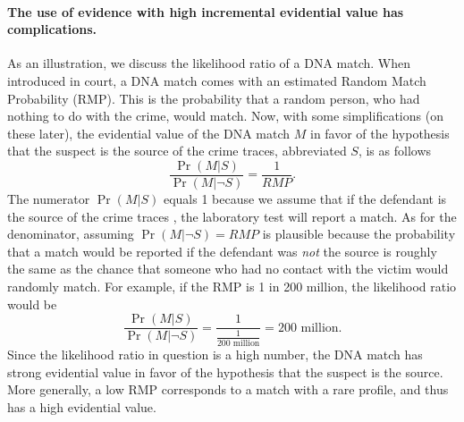 \documentclass[10pt]{article}
\begin{document}
\paragraph{The use of evidence with high incremental evidential value has complications.}

As an illustration, we discuss the likelihood ratio 
of a DNA match. %
When introduced in court, a DNA match comes with an 
estimated Random Match Probability (RMP). This is the probability that a random person, who 
had nothing to do with the crime, would match. %
%
Now, with some simplifications (on these later), 
the evidential value of the DNA 
match $M$ in favor of the hypothesis that the 
suspect is the source of the crime traces, abbreviated $S$, %
is as follows %
%
\[
\frac{\Pr(M | S)}{\Pr(M | \neg S)} =  \frac{1}{RMP}.
\]
%
The numerator $\Pr(M | S)$ equals 1 because we assume that %
if the defendant is the source of the crime traces%
, the laboratory test will report a match. As for the denominator, 
assuming $\Pr(M | \neg S)=RMP$ is plausible because the probability that a match would be reported if the defendant was \textit{not} 
the source is roughly the same as the chance that someone who had no contact with the victim would randomly match. 
For example, if the RMP is 1 in 200 million, the likelihood ratio would be
%
\[\frac{\Pr(M |S)}{\Pr( M | \neg S)}=\frac{1}{\frac{1}{\text{200 million}}}=\text{200 million}.\]
%
Since the likelihood ratio in question is a high number, the DNA match has strong evidential value in favor of the hypothesis that the suspect is the source. 
More generally, a low RMP corresponds to a match with a rare profile, and thus has a high evidential value. 
\end{document}
